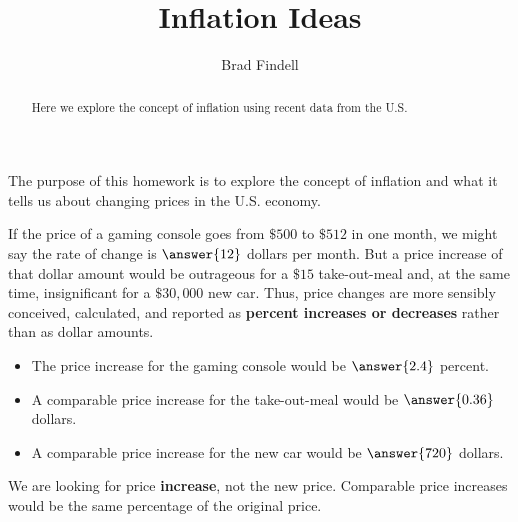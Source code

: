 \documentclass{ximera}
\title{Inflation Ideas}
\author{Brad Findell}
\begin{document}
\begin{abstract}
Here we explore the concept of inflation using recent data from the U.S.
\end{abstract}
\maketitle

The purpose of this homework is to explore the concept of inflation and what it tells us about changing prices in the U.S. economy. 

\begin{question}
If the price of a gaming console goes from $\$500$ to $\$512$ in one month, we might say the rate of change is $\answer{12}$ dollars per month.  But a price increase of that dollar amount would be outrageous for a $\$15$ take-out-meal and, at the same time, insignificant for a $\$30,000$ new car. Thus, price changes are more sensibly conceived, calculated, and reported as \textbf{percent increases or decreases} rather than as dollar amounts.  

\begin{itemize}
\item The price increase for the gaming console would be $\answer{2.4}$ percent.  
\item A comparable price increase for the take-out-meal would be $\answer{0.36}$ dollars. 
\item A comparable price increase for the new car would be $\answer{720}$ dollars. 
\end{itemize}
\begin{hint}
We are looking for price \textbf{increase}, not the new price.  Comparable price increases would be the same percentage of the original price.  
\end{hint}
\end{question}
\end{document}

